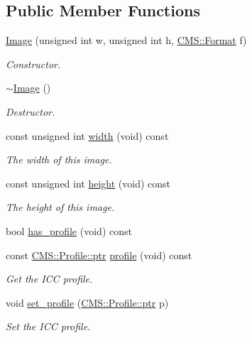\subsection*{Public Member Functions}
\begin{DoxyCompactItemize}
\item 
\hyperlink{class_photo_finish_1_1_image_abffc53a4457723380ba48f27f2412452}{Image} (unsigned int w, unsigned int h, \hyperlink{class_c_m_s_1_1_format}{C\+M\+S\+::\+Format} f)
\begin{DoxyCompactList}\small\item\em Constructor. \end{DoxyCompactList}\item 
\hyperlink{class_photo_finish_1_1_image_a6c300a891d479ece70ffa849b39397fd}{$\sim$\+Image} ()
\begin{DoxyCompactList}\small\item\em Destructor. \end{DoxyCompactList}\item 
const unsigned int \hyperlink{class_photo_finish_1_1_image_a2e6a66ad3009ab109e06ed0ac1878d18}{width} (void) const
\begin{DoxyCompactList}\small\item\em The width of this image. \end{DoxyCompactList}\item 
const unsigned int \hyperlink{class_photo_finish_1_1_image_abbfb02924c4b27949369526326bc11b9}{height} (void) const
\begin{DoxyCompactList}\small\item\em The height of this image. \end{DoxyCompactList}\item 
bool \hyperlink{class_photo_finish_1_1_image_a533606b08f614fe486835fccfcbbc6dd}{has\+\_\+profile} (void) const
\item 
const \hyperlink{class_c_m_s_1_1_profile_a7d5a80e1317d17dbfdf5ae69820ab08b}{C\+M\+S\+::\+Profile\+::ptr} \hyperlink{class_photo_finish_1_1_image_af70cbcdb6f40471c08a462cf10ea86fb}{profile} (void) const
\begin{DoxyCompactList}\small\item\em Get the I\+CC profile. \end{DoxyCompactList}\item 
void \hyperlink{class_photo_finish_1_1_image_a5375d13c5ed04714d1ebc8dcbb2f0c4f}{set\+\_\+profile} (\hyperlink{class_c_m_s_1_1_profile_a7d5a80e1317d17dbfdf5ae69820ab08b}{C\+M\+S\+::\+Profile\+::ptr} p)
\begin{DoxyCompactList}\small\item\em Set the I\+CC profile. \end{DoxyCompactList}\item 

\end{DoxyCompactItemize}
